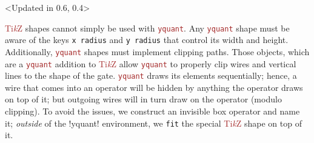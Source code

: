 \documentclass{scrartcl}
\makeatletter
\newenvironment{codeexample*}{%
   \VerbatimEnvironment%
   \let\FVB@VerbatimOut\minted@FVB@VerbatimOut
   \let\FVE@VerbatimOut\minted@FVE@VerbatimOut
   \minted@configlang{tex}%
   \minted@fvset
   \begin{VerbatimOut}[codes={\catcode`\^^I=12},firstline,lastline]{\minted@jobname.pyg}%
}{
   \end{VerbatimOut}%
   \minted@langlinenoson%
   \begin{adjustbox}{center}
       \minted@jobname.pyg %
   \end{adjustbox}\nopagebreak
   \expandafter\minted@pygmentize\expandafter{\minted@lang}%
   \minted@langlinenosoff%
   \par%
}
\def\TikZ{\textcolor{brown}{Ti\textit kZ}}
\def\pkg#1{\textcolor{brown}{\texttt{#1}}}
\def\Yquant{\pkg{yquant}}
\makeatother
\begin{document}
               \begin{example}<Updated in 0.6, 0.4>
                  \begin{codeexample*}
                  \end{codeexample*}
                  \TikZ{} shapes cannot simply be used with \Yquant.
                  Any \Yquant{} shape must be aware of the keys \texttt{x radius} and \texttt{y radius} that control its width and height.
                  Additionally, \Yquant{} shapes must implement clipping paths.
                  Those objects, which are a \Yquant{} addition to \TikZ{} allow \Yquant{} to properly clip wires and vertical lines to the shape of the gate.
                  \Yquant{} draws its elements sequentially; hence, a wire that comes into an operator will be hidden by anything the operator draws on top of it; but outgoing wires will in turn draw on the operator (modulo clipping).
                  To avoid the issues, we construct an invisible box operator and name it; \emph{outside} of the \tex!yquant! environment, we \texttt{fit} the special \TikZ{} shape on top of it.
               \end{example}
\end{document}
